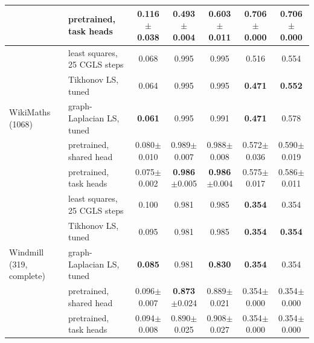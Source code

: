 \begin{tabular}{llccccc}
 & pretrained, task heads & 0.116{\scriptsize$\pm$0.038} & \textbf{0.493}{\scriptsize$\pm$0.004} & 0.603{\scriptsize$\pm$0.011} & 0.706{\scriptsize$\pm$0.000} & 0.706{\scriptsize$\pm$0.000} \\
\midrule
\multirow{5}{*}{WikiMaths (1068)} & least squares, 25 CGLS steps & 0.068 & 0.995 & 0.995 & 0.516 & 0.554 \\
 & Tikhonov LS, tuned & 0.064 & 0.995 & 0.995 & \textbf{0.471} & \textbf{0.552} \\
 & graph-Laplacian LS, tuned & \textbf{0.061} & 0.995 & 0.991 & \textbf{0.471} & 0.578 \\
 & pretrained, shared head & 0.080{\scriptsize$\pm$0.010} & 0.989{\scriptsize$\pm$0.007} & 0.988{\scriptsize$\pm$0.008} & 0.572{\scriptsize$\pm$0.036} & 0.590{\scriptsize$\pm$0.019} \\
 & pretrained, task heads & 0.075{\scriptsize$\pm$0.002} & \textbf{0.986}{\scriptsize$\pm$0.005} & \textbf{0.986}{\scriptsize$\pm$0.004} & 0.575{\scriptsize$\pm$0.017} & 0.586{\scriptsize$\pm$0.011} \\
\midrule
\multirow{5}{*}{Windmill (319, complete)} & least squares, 25 CGLS steps & 0.100 & 0.981 & 0.985 & \textbf{0.354} & 0.354 \\
 & Tikhonov LS, tuned & 0.095 & 0.981 & 0.985 & \textbf{0.354} & \textbf{0.354} \\
 & graph-Laplacian LS, tuned & \textbf{0.085} & 0.981 & \textbf{0.830} & \textbf{0.354} & 0.354 \\
 & pretrained, shared head & 0.096{\scriptsize$\pm$0.007} & \textbf{0.873}{\scriptsize$\pm$0.024} & 0.889{\scriptsize$\pm$0.021} & 0.354{\scriptsize$\pm$0.000} & 0.354{\scriptsize$\pm$0.000} \\
 & pretrained, task heads & 0.094{\scriptsize$\pm$0.008} & 0.890{\scriptsize$\pm$0.025} & 0.908{\scriptsize$\pm$0.027} & 0.354{\scriptsize$\pm$0.000} & 0.354{\scriptsize$\pm$0.000} \\
\bottomrule
\end{tabular}
